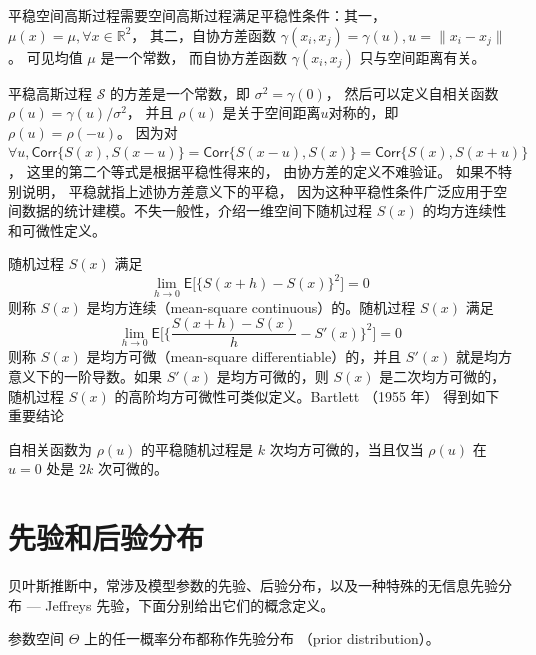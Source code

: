 \documentclass[12pt,a4paper,UTF8,twoside]{book}
\theoremstyle{definition}
\theoremstyle{definition}
\theoremstyle{definition}
\theoremstyle{remark}
\let\BeginKnitrBlock\begin \let\EndKnitrBlock\end
\begin{document}
平稳空间高斯过程需要空间高斯过程满足平稳性条件：其一， \(\mu(x) = \mu, \forall x \in \mathbb{R}^2\)， 其二，自协方差函数 \(\gamma(x_i,x_j) = \gamma(u),u=\|x_{i} - x_{j}\|\)。 可见均值 \(\mu\) 是一个常数， 而自协方差函数 \(\gamma(x_i,x_j)\) 只与空间距离有关。

平稳高斯过程 \(\mathcal{S}\) 的方差是一个常数，即 \(\sigma^2 = \gamma(0)\)， 然后可以定义自相关函数 \(\rho(u) = \gamma(u)/\sigma^2\)， 并且 \(\rho(u)\) 是关于空间距离\(u\)对称的，即 \(\rho(u) = \rho(-u)\)。 因为对 \(\forall u, \mathsf{Corr}\{S(x),S(x-u)\} = \mathsf{Corr}\{S(x-u), S(x)\} = \mathsf{Corr}\{S(x),S(x+u)\}\)， 这里的第二个等式是根据平稳性得来的， 由协方差的定义不难验证。 如果不特别说明， 平稳就指上述协方差意义下的平稳， 因为这种平稳性条件广泛应用于空间数据的统计建模。不失一般性，介绍一维空间下随机过程 \(S(x)\) 的均方连续性和可微性定义。

\BeginKnitrBlock{definition}[连续性和可微性]
\protect\hypertarget{def:continuous-differentiable}{}{\label{def:continuous-differentiable} {} }随机过程 \(S(x)\) 满足
\[ \lim_{h \to 0} \mathsf{E}\big[ \{S(x + h) - S(x)\}^{2} \big] = 0 \]
\noindent 则称 \(S(x)\) 是均方连续（mean-square continuous）的。随机过程 \(S(x)\) 满足
\[ \lim_{h \to 0} \mathsf{E} \big[ \{ \frac{S(x+h) - S(x)}{h} - S'(x) \}^2 \big] = 0 \]
\noindent 则称 \(S(x)\) 是均方可微（mean-square differentiable）的，并且 \(S'(x)\) 就是均方意义下的一阶导数。如果 \(S'(x)\) 是均方可微的，则 \(S(x)\) 是二次均方可微的，随机过程 \(S(x)\) 的高阶均方可微性可类似定义\citep{Diggle2007}。Bartlett （1955 年） \citep{Bartlett1955} 得到如下重要结论
\EndKnitrBlock{definition}

\BeginKnitrBlock{theorem}[平稳随机过程的可微性]
\protect\hypertarget{thm:stationary-mean-square-properties}{}{\label{thm:stationary-mean-square-properties} {} }自相关函数为 \(\rho(u)\) 的平稳随机过程是 \(k\) 次均方可微的，当且仅当 \(\rho(u)\) 在 \(u = 0\) 处是 \(2k\) 次可微的。
\EndKnitrBlock{theorem}

\hypertarget{sec:bayes-prior}{%
\section{先验和后验分布}\label{sec:bayes-prior}}

贝叶斯推断中，常涉及模型参数的先验、后验分布，以及一种特殊的无信息先验分布 --- Jeffreys 先验，下面分别给出它们的概念定义\citep{mao2006}。

\BeginKnitrBlock{definition}[先验分布]
\protect\hypertarget{def:prior-distribution}{}{\label{def:prior-distribution} {} }参数空间 \(\Theta\) 上的任一概率分布都称作先验分布 （prior distribution）\citep{mao2006}。
\EndKnitrBlock{definition}
\end{document}
